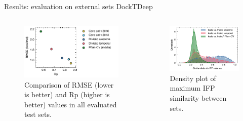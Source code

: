\documentclass[aspectratio=169,xcolor=dvipsnames]{beamer}
\begin{document}
\begin{frame}{Results: evaluation on external sets \hfill {\footnotesize \alert{DockTDeep}}}
    \begin{columns}[c]
        \begin{figure}
            \centering
            \includegraphics[width=1\textwidth]{imgs/results/fig5a_external_performance.pdf}
            \caption{Comparison of RMSE (lower is better) and Rp (higher is better) values in all evaluated test sets.}
        \end{figure}

        \begin{figure}[ht!]
            \centering
            \includegraphics[width=1\textwidth]{imgs/results/ifp-similarity.pdf}
            \caption{Density plot of maximum IFP similarity between sets.}
        \end{figure}

    \end{columns}
\end{frame}
\end{document}
